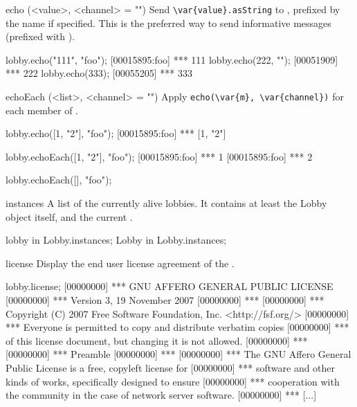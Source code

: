 \begin{urbiscriptapi}
\item[echo](<value>, <channel> = "")%
  Send \lstinline|\var{value}.asString| to \this, prefixed
  by the   name if specified.  This is
  the preferred way to send informative messages (prefixed with
  \samp{***}).
\begin{urbiscript}
lobby.echo("111", "foo");
[00015895:foo] *** 111
lobby.echo(222, "");
[00051909] *** 222
lobby.echo(333);
[00055205] *** 333
\end{urbiscript}

\item[echoEach](<list>, <channel> = "")%
  Apply \lstinline|echo(\var{m}, \var{channel})| for each member  of
  .
\begin{urbiscript}
lobby.echo([1, "2"], "foo");
[00015895:foo] *** [1, "2"]

lobby.echoEach([1, "2"], "foo");
[00015895:foo] *** 1
[00015895:foo] *** 2

lobby.echoEach([], "foo");
\end{urbiscript}


\item[instances]
  A list of the currently alive lobbies.  It contains at least the Lobby
  object itself, and the current .
\begin{urbiassert}
lobby in Lobby.instances;
Lobby in Lobby.instances;
\end{urbiassert}

\item[license]
  Display the end user license agreement of the \usdk.
\begin{urbiunchecked}
lobby.license;
[00000000] ***                     GNU AFFERO GENERAL PUBLIC LICENSE
[00000000] ***                        Version 3, 19 November 2007
[00000000] ***
[00000000] ***  Copyright (C) 2007 Free Software Foundation, Inc. <http://fsf.org/>
[00000000] ***  Everyone is permitted to copy and distribute verbatim copies
[00000000] ***  of this license document, but changing it is not allowed.
[00000000] ***
[00000000] ***                             Preamble
[00000000] ***
[00000000] ***   The GNU Affero General Public License is a free, copyleft license for
[00000000] *** software and other kinds of works, specifically designed to ensure
[00000000] *** cooperation with the community in the case of network server software.
[00000000] *** [...]
\end{urbiunchecked}


\end{urbiscriptapi}
